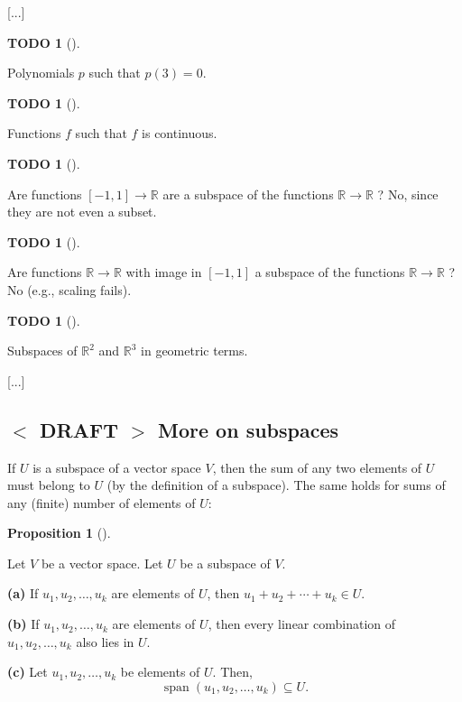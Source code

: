\documentclass[numbers=enddot,12pt,final,onecolumn,notitlepage]{scrartcl}%
\theoremstyle{definition}
\newtheorem{prop}[theo]{Proposition}
\newenvironment{proposition}[1][]
{\begin{prop}[#1]\begin{leftbar}}
{\end{leftbar}\end{prop}}
\newtheorem{quest}[theo]{TODO}
\newenvironment{todo}[1][]
{\begin{quest}[#1]\begin{leftbar}}
{\end{leftbar}\end{quest}}
\begin{document}
[...]

\begin{todo}
Polynomials $p$ such that $p\left(  3\right)  =0$.
\end{todo}

\begin{todo}
Functions $f$ such that $f$ is continuous.
\end{todo}

\begin{todo}
Are functions $\left[  -1,1\right]  \rightarrow\mathbb{R}$ are a subspace of
the functions $\mathbb{R}\rightarrow\mathbb{R}$ ? No, since they are not even
a subset.
\end{todo}

\begin{todo}
Are functions $\mathbb{R}\rightarrow\mathbb{R}$ with image in $\left[
-1,1\right]  $ a subspace of the functions $\mathbb{R}\rightarrow\mathbb{R}$ ?
No (e.g., scaling fails).
\end{todo}

\begin{todo}
Subspaces of $\mathbb{R}^{2}$ and $\mathbb{R}^{3}$ in geometric terms.
\end{todo}

[...]

\subsection{\label{sect.spaces.more-on-subs}%
$<$%
DRAFT%
$>$
More on subspaces}

If $U$ is a subspace of a vector space $V$, then the sum of any two elements
of $U$ must belong to $U$ (by the definition of a subspace). The same holds
for sums of any (finite) number of elements of $U$:

\begin{proposition}
\label{prop.subspace.closed}Let $V$ be a vector space. Let $U$ be a subspace
of $V$.

\textbf{(a)} If $u_{1},u_{2},\ldots,u_{k}$ are elements of $U$, then
$u_{1}+u_{2}+\cdots+u_{k}\in U$.

\textbf{(b)} If $u_{1},u_{2},\ldots,u_{k}$ are elements of $U$, then every
linear combination of $u_{1},u_{2},\ldots,u_{k}$ also lies in $U$.

\textbf{(c)} Let $u_{1},u_{2},\ldots,u_{k}$ be elements of $U$. Then,
\[
\operatorname{span}\left(  u_{1},u_{2},\ldots,u_{k}\right)  \subseteq U.
\]

\end{proposition}
\end{document}
